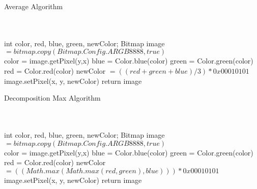 \documentclass[11pt]{article}
\begin{document}
  \begin{algorithm}
   \caption{Average Algorithm}
    \begin{algorithmic}[1]
      \\
		\\
        \State int color, red, blue, green, newColor;
        \State  Bitmap image $= bitmap.copy(Bitmap.Config.ARGB8888, true)$
\\
            		\State color = image.getPixel(y,x)
            		\State blue = Color.blue(color)
            		\State green = Color.green(color)
            		\State red = Color.red(color)
            		\State newColor $= ((red+green+blue)/3)*0x00010101$
                \State image.setPixel(x, y, newColor)
        		\EndFor
        \EndFor
        \State return image
       \EndFunction

\end{algorithmic}
\end{algorithm}
\begin{algorithm}
   \caption{Decomposition Max Algorithm}
    \begin{algorithmic}[1]
      \\
		\\
        \State int color, red, blue, green, newColor;
        \State  Bitmap image $= bitmap.copy(Bitmap.Config.ARGB8888, true)$
\\
            		\State color = image.getPixel(y,x)
            		\State blue = Color.blue(color)
            		\State green = Color.green(color)
            		\State red = Color.red(color)
            		\State newColor $= ((Math.max(Math.max(red, green), blue)))*0x00010101$
                \State image.setPixel(x, y, newColor)
        		\EndFor
        \EndFor
        \State return image
       \EndFunction

\end{algorithmic}
\end{algorithm}
\end{document}
